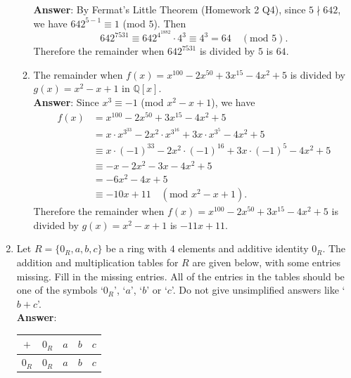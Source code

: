 \documentclass{article}
\begin{document}
\begin{enumerate}
\begin{enumerate}
                        \textbf{Answer}: By Fermat's Little Theorem (Homework 2 Q4), since $5\nmid 642$, we have $642^{5-1}\equiv 1$ (mod $5$). Then \[642^{7531}\equiv 642^{4^{1882}}\cdot 4^3\equiv 4^3=64\quad(\text{mod }5).\] Therefore the remainder when $642^{7531}$ is divided by $5$ is $64$.
                  \item The remainder when $f(x)=x^{100}-2x^{50}+3x^{15}-4x^2+5$ is divided by $g(x)=x^2-x+1$ in $\mathbb{Q}[x]$.\\
                        \textbf{Answer}: Since $x^3\equiv -1$ (mod $x^2-x+1$), we have
                        \begin{align*}
                              f(x) & =x^{100}-2x^{50}+3x^{15}-4x^2+5                                \\
                                   & =x\cdot x^{3^{33}}-2x^2\cdot x^{3^{16}}+3x\cdot x^{3^5}-4x^2+5 \\
                                   & \equiv x\cdot(-1)^{33}-2x^2\cdot(-1)^{16}+3x\cdot(-1)^5-4x^2+5 \\
                                   & \equiv -x-2x^2-3x-4x^2+5                                       \\
                                   & =-6x^2-4x+5                                                    \\
                                   & \equiv -10x+11\quad(\text{mod }x^2-x+1).
                        \end{align*}
                        Therefore the remainder when $f(x)=x^{100}-2x^{50}+3x^{15}-4x^2+5$ is divided by $g(x)=x^2-x+1$ is $-11x+11$.
            \end{enumerate}
      \item Let $R=\{0_R,a,b,c\}$ be a ring with $4$ elements and additive identity $0_R$. The addition and multiplication tables for $R$ are given below, with some entries missing. Fill in the missing entries. All of the entries in the tables should be one of the symbols `$0_R$', `$a$', `$b$' or `$c$'. Do not give unsimplified answers like `$b+c$'.\\
            \textbf{Answer}:
            \begin{center}
                  \begin{tabular}{c|c c c c}
                        $+$   & $0_R$ & $a$   & $b$   & $c$   \\
                        \hline
                        $0_R$ & $0_R$ & $a$   & $b$   & $c$   \\

\end{tabular}
\end{center}
\end{enumerate}
\end{document}
